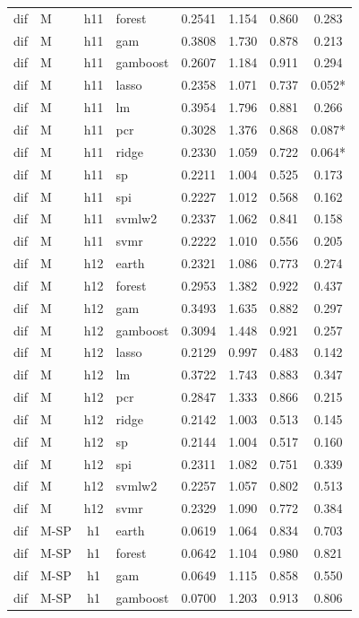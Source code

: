 \begin{ThreePartTable}
\begin{longtable}[t]{llclcccc}
dif & M & h11 & forest & 0.2541 & 1.154 & 0.860 & 0.283\\
dif & M & h11 & gam & 0.3808 & 1.730 & 0.878 & 0.213\\
dif & M & h11 & gamboost & 0.2607 & 1.184 & 0.911 & 0.294\\
dif & M & h11 & lasso & 0.2358 & 1.071 & 0.737 & 0.052*\\
dif & M & h11 & lm & 0.3954 & 1.796 & 0.881 & 0.266\\
dif & M & h11 & pcr & 0.3028 & 1.376 & 0.868 & 0.087*\\
dif & M & h11 & ridge & 0.2330 & 1.059 & 0.722 & 0.064*\\
dif & M & h11 & sp & 0.2211 & 1.004 & 0.525 & 0.173\\
dif & M & h11 & spi & 0.2227 & 1.012 & 0.568 & 0.162\\
dif & M & h11 & svmlw2 & 0.2337 & 1.062 & 0.841 & 0.158\\
dif & M & h11 & svmr & 0.2222 & 1.010 & 0.556 & 0.205\\
\addlinespace
dif & M & h12 & earth & 0.2321 & 1.086 & 0.773 & 0.274\\
dif & M & h12 & forest & 0.2953 & 1.382 & 0.922 & 0.437\\
dif & M & h12 & gam & 0.3493 & 1.635 & 0.882 & 0.297\\
dif & M & h12 & gamboost & 0.3094 & 1.448 & 0.921 & 0.257\\
dif & M & h12 & lasso & 0.2129 & 0.997 & 0.483 & 0.142\\
dif & M & h12 & lm & 0.3722 & 1.743 & 0.883 & 0.347\\
dif & M & h12 & pcr & 0.2847 & 1.333 & 0.866 & 0.215\\
dif & M & h12 & ridge & 0.2142 & 1.003 & 0.513 & 0.145\\
dif & M & h12 & sp & 0.2144 & 1.004 & 0.517 & 0.160\\
dif & M & h12 & spi & 0.2311 & 1.082 & 0.751 & 0.339\\
dif & M & h12 & svmlw2 & 0.2257 & 1.057 & 0.802 & 0.513\\
dif & M & h12 & svmr & 0.2329 & 1.090 & 0.772 & 0.384\\
\addlinespace
dif & M-SP & h1 & earth & 0.0619 & 1.064 & 0.834 & 0.703\\
dif & M-SP & h1 & forest & 0.0642 & 1.104 & 0.980 & 0.821\\
dif & M-SP & h1 & gam & 0.0649 & 1.115 & 0.858 & 0.550\\
dif & M-SP & h1 & gamboost & 0.0700 & 1.203 & 0.913 & 0.806\\

\end{longtable}
\end{ThreePartTable}
